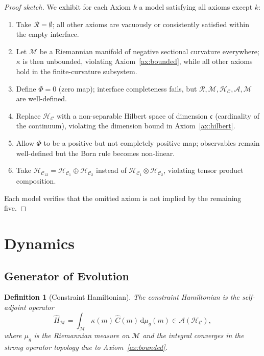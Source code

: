 \documentclass[twocolumn,aps,prd,superscriptaddress,nofootinbib]{revtex4-2}
\newtheorem{definition}{Definition}[section]
\newcommand{\HC}{\mathcal{H}_{\mathcal{C}}}
\newcommand{\CR}{\mathcal{R}}
\newcommand{\CM}{\mathcal{M}}
\newcommand{\CA}{\mathcal{A}}
\newcommand{\hatC}{\hat{C}}
\newcommand{\hatH}{\hat{H}}
\begin{document}
\begin{proof}[Proof sketch]
We exhibit for each Axiom $k$ a model satisfying all axioms except $k$:
\begin{enumerate}
\item[$k=1$:] Take $\CR = \emptyset$; all other axioms are vacuously or
   consistently satisfied within the empty interface.
\item[$k=2$:] Let $\CM$ be a Riemannian manifold of negative sectional
   curvature everywhere; $\kappa$ is then unbounded, violating
   Axiom~\ref{ax:bounded}, while all other axioms hold in the finite-curvature
   subsystem.
\item[$k=3$:] Define $\Phi = 0$ (zero map); interface completeness fails,
   but $\CR, \CM, \HC, \CA, \CM$ are well-defined.
\item[$k=4$:] Replace $\HC$ with a non-separable Hilbert space of dimension
   $\mathfrak{c}$ (cardinality of the continuum), violating the
   dimension bound in Axiom~\ref{ax:hilbert}.
\item[$k=5$:] Allow $\Phi$ to be a positive but not completely positive map;
   observables remain well-defined but the Born rule becomes non-linear.
\item[$k=6$:] Take $\HC_{12} = \HC_1 \oplus \HC_2$ instead of
   $\HC_1 \otimes \HC_2$, violating tensor product composition.
\end{enumerate}
Each model verifies that the omitted axiom is not implied by the remaining five.
\end{proof}

\section{Dynamics}
\label{sec:dynamics}

\subsection{Generator of Evolution}

\begin{definition}[Constraint Hamiltonian]
\label{def:hamiltonian}
The \emph{constraint Hamiltonian} is the self-adjoint operator
\[
  \hatH_\CM = \int_\CM \kappa(m)\,\hatC(m)\,\mathrm{d}\mu_g(m) \in \CA(\HC),
\]
where $\mu_g$ is the Riemannian measure on $\CM$ and the integral converges
in the strong operator topology due to Axiom~\ref{ax:bounded}.
\end{definition}
\end{document}
